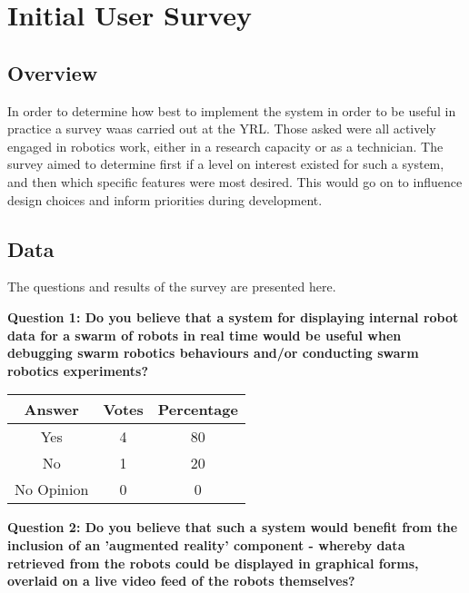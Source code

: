 
\chapter[Initial User Survey]{Initial User Survey} %

\label{Chapter7} %


\section{Overview}
In order to determine how best to implement the system in order to be useful in practice a survey waas carried out at the YRL. Those asked were all actively engaged in robotics work, either in a research capacity or as a technician. The survey aimed to determine first if a level on interest existed for such a system, and then which specific features were most desired. This would go on to influence design choices and inform priorities during development.


\section{Data}
The questions and results of the survey are presented here.

\textbf{Question 1: Do you believe that a system for displaying internal robot data for a swarm of robots in real time would be useful when debugging swarm robotics behaviours and/or conducting swarm robotics experiments?}

\begin{center}
\begin{tabular}{ c c c }
 Answer & Votes & Percentage \\ 
 \hline
 Yes & 4 & 80 \\ 
 No & 1 & 20 \\
 No Opinion & 0 & 0 \\
\end{tabular}
\end{center}

\vspace{1cm}

\textbf{Question 2: Do you believe that such a system would benefit from the inclusion of an 'augmented reality' component - whereby data retrieved from the robots could be displayed in graphical forms, overlaid on a live video feed of the robots themselves?}

